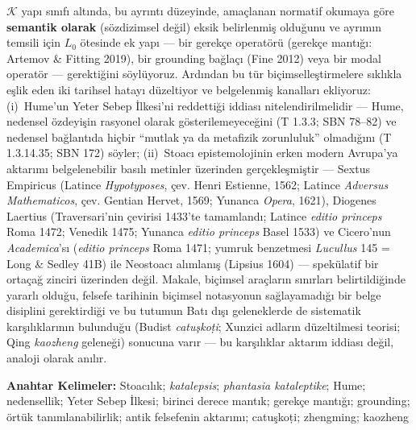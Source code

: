 \documentclass[11pt]{article}
\theoremstyle{plain}
\theoremstyle{definition}
\theoremstyle{remark}
\begin{document}
$\mathcal K$ yap{\i} s{\i}n{\i}f{\i} alt{\i}nda, bu ayr{\i}nt{\i}
d\"uzeyinde, ama\c{c}lanan normatif okumaya g\"ore \textbf{semantik
olarak} (s\"ozdizimsel de\u{g}il) eksik belirlenmi\c{s} oldu\u{g}unu
ve ayr{\i}m{\i}n temsili i\c{c}in $L_0$ \"otesinde ek yap{\i} --- bir
gerek\c{c}e operat\"or\"u (gerek\c{c}e mant{\i}\u{g}{\i}: Artemov \&
Fitting 2019), bir grounding ba\u{g}la\c{c}{\i} (Fine 2012) veya bir
modal operat\"or --- gerekti\u{g}ini s\"oyl\"uyoruz. Ard{\i}ndan bu
t\"ur bi\c{c}imselle\c{s}tirmelere s{\i}kl{\i}kla e\c{s}lik eden iki
tarihsel hatay{\i} d\"uzeltiyor ve belgelenmi\c{s} kanallar{\i}
ekliyoruz: (i)~Hume'un Yeter Sebep \.{I}lkesi'ni reddetti\u{g}i iddias{\i}
nitelendirilmelidir --- Hume, nedensel \"ozdeyi\c{s}in rasyonel olarak
g\"osterilemeyece\u{g}ini (T 1.3.3; SBN 78--82) ve nedensel
ba\u{g}lant{\i}da hi\c{c}bir ``mutlak ya da metafizik zorunluluk''
olmad{\i}\u{g}{\i}n{\i} (T 1.3.14.35; SBN 172) s\"oyler;
(ii)~Stoac{\i} epistemolojinin erken modern Avrupa'ya aktar{\i}m{\i}
belgelenebilir bas{\i}l{\i} metinler \"uzerinden ger\c{c}ekle\c{s}mi\c{s}tir
--- Sextus Empiricus (Latince \emph{Hypotyposes}, \c{c}ev. Henri
Estienne, 1562; Latince \emph{Adversus Mathematicos}, \c{c}ev. Gentian
Hervet, 1569; Yunanca \emph{Opera}, 1621), Diogenes Laertius
(Traversari'nin \c{c}evirisi 1433'te tamamland{\i}; Latince \emph{editio
princeps} Roma 1472; Venedik 1475; Yunanca \emph{editio princeps} Basel
1533) ve Cicero'nun \emph{Academica}'s{\i} (\emph{editio princeps} Roma
1471; yumruk benzetmesi \emph{Lucullus} 145 = Long \& Sedley 41B) ile
Neostoac{\i} al{\i}mlan{\i}\c{s} (Lipsius 1604) --- spek\"ulatif bir
orta\c{c}a\u{g} zinciri \"uzerinden de\u{g}il. Makale, bi\c{c}imsel
ara\c{c}lar{\i}n s{\i}n{\i}rlar{\i} belirtildi\u{g}inde yararl{\i}
oldu\u{g}u, felsefe tarihinin bi\c{c}imsel notasyonun sa\u{g}layamad{\i}\u{g}{\i}
bir belge disiplini gerektirdi\u{g}i ve bu tutumun Bat{\i} d{\i}\c{s}{\i}
geleneklerde de sistematik kar\c{s}{\i}l{\i}klar{\i}n{\i}n bulundu\u{g}u
(Budist \emph{catu\c{s}ko\d{t}i}; Xunzici adlar{\i}n d\"uzeltilmesi
teorisi; Qing \emph{kaozheng} gelene\u{g}i) sonucuna var{\i}r --- bu
kar\c{s}{\i}l{\i}klar aktar{\i}m iddias{\i} de\u{g}il, analoji olarak
an{\i}l{\i}r.

\noindent\textbf{Anahtar Kelimeler:} Stoac{\i}l{\i}k; \emph{katalepsis};
\emph{phantasia kataleptike}; Hume; nedensellik; Yeter Sebep \.{I}lkesi;
birinci derece mant{\i}k; gerek\c{c}e mant{\i}\u{g}{\i}; grounding;
\"ort\"uk tan{\i}mlanabilirlik; antik felsefenin aktar{\i}m{\i};
catu\c{s}ko\d{t}i; zhengming; kaozheng
\end{document}
